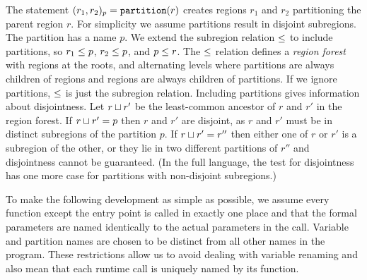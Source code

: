 The statement $(r_1, r_2)_{p} = \mbox{\tt partition}(r)$ creates
regions $r_1$ and $r_2$ partitioning the parent region $r$.  For
simplicity we assume partitions result in disjoint subregions.  The
partition has a name $p$.  We extend the subregion
relation $\leq$ to include partitions, so $r_1 \leq p$, $r_2 \leq
p$, and $p \leq r$.  The $\leq$ relation defines a {\em region
forest} with regions at the roots, and alternating levels where
partitions are always children of regions and regions are always
children of partitions.  If we ignore partitions, $\leq$ is just the
subregion relation.  Including partitions gives information about
disjointness.  Let $r \sqcup r'$ be the
least-common ancestor of $r$ and $r'$ in the region forest.  If
$r \sqcup r' = p$ then $r$ and $r'$ are disjoint, as $r$ and $r'$ must
be in distinct subregions of the partition $p$.  If $r \sqcup r' = r''$ then either one of $r$ or $r'$
is a subregion of the other, or they lie in two different partitions of
$r''$ and disjointness cannot be guaranteed.  (In the full
language, the test for disjointness has one more case for
partitions with non-disjoint subregions.)



To make the following development as simple as possible, we assume every
function except the entry point is called in exactly one place and that the formal
parameters are named identically to the actual parameters in the
call.  Variable and partition names are chosen to be distinct from all
other names in the program.  These restrictions allow us to avoid
dealing with variable renaming and also mean that each runtime call is
uniquely named by its function.




